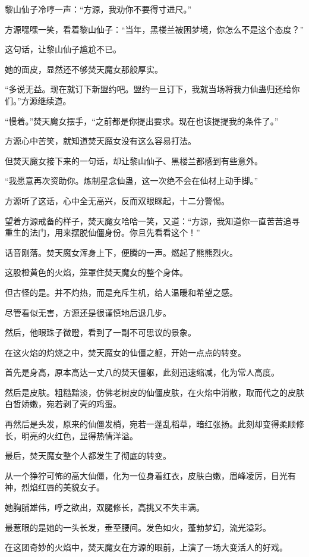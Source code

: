 \begin{this_body}
黎山仙子冷哼一声：“方源，我劝你不要得寸进尺。”

方源嘿嘿一笑，看着黎山仙子：“当年，黑楼兰被困梦境，你怎么不是这个态度？”

这句话，让黎山仙子尴尬不已。

她的面皮，显然还不够焚天魔女那般厚实。

“多说无益。现在就订下新盟约吧。盟约一旦订下，我就当场将我力仙蛊归还给你们。”方源继续道。

“慢着。”焚天魔女摆手，“之前都是你提出要求。现在也该提提我的条件了。”

方源心中苦笑，就知道焚天魔女没有这么容易打法。

但焚天魔女接下来的一句话，却让黎山仙子、黑楼兰都感到有些意外。

“我愿意再次资助你。炼制星念仙蛊，这一次绝不会在仙材上动手脚。”

方源听了这话，心中全无高兴，反而双眼眯起，十二分警惕。

望着方源戒备的样子，焚天魔女哈哈一笑，又道：“方源，我知道你一直苦苦追寻重生的法门，用来摆脱仙僵身份。你且先看看这个！”

话音刚落。焚天魔女浑身上下，便腾的一声。燃起了熊熊烈火。

这股橙黄色的火焰，笼罩住焚天魔女的整个身体。

但古怪的是。并不灼热，而是充斥生机，给人温暖和希望之感。

尽管看似无害，方源还是很谨慎地后退几步。

然后，他眼珠子微瞪，看到了一副不可思议的景象。

在这火焰的灼烧之中，焚天魔女的仙僵之躯，开始一点点的转变。

首先是身高，原本高达一丈八的焚天僵躯，此刻迅速缩减，化为常人高度。

然后是皮肤。粗糙黯淡，仿佛老树皮的仙僵皮肤，在火焰中消散，取而代之的皮肤白皙娇嫩，宛若剥了壳的鸡蛋。

再然后是头发，原来的仙僵发梢，宛若一蓬乱稻草，暗红张扬。此刻却变得柔顺修长，明亮的火红色，显得热情洋溢。

最后，焚天魔女整个人都发生了彻底的转变。

从一个狰狞可怖的高大仙僵，化为一位身着红衣，皮肤白嫩，眉峰凌厉，目光有神，烈焰红唇的美貌女子。

她胸脯雄伟，呼之欲出，双腿修长，高挑又不失丰满。

最惹眼的是她的一头长发，垂至腰间。发色如火，蓬勃梦幻，流光溢彩。

在这团奇妙的火焰中，焚天魔女在方源的眼前，上演了一场大变活人的好戏。


\end{this_body}
